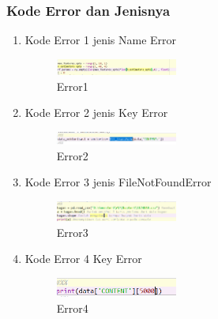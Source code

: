         \subsubsection{Kode Error dan Jenisnya}
        \begin{enumerate}
            \item Kode Error 1 jenis Name Error
            \begin{figure}[H]
                \includegraphics[width=4cm]{figures/1174040/chapter4/err1.png}
                \centering
                \caption{Error1}
            \end{figure}
            \item Kode Error 2 jenis Key Error
            \begin{figure}[H]
                \includegraphics[width=4cm]{figures/1174040/chapter4/err2.png}
                \centering
                \caption{Error2}
            \end{figure}
            \item Kode Error 3 jenis FileNotFoundError
            \begin{figure}[H]
                \includegraphics[width=4cm]{figures/1174040/chapter4/err3.png}
                \centering
                \caption{Error3}
            \end{figure}
            \item Kode Error 4 Key Error
            \begin{figure}[H]
                \includegraphics[width=4cm]{figures/1174040/chapter4/err4.png}
                \centering
                \caption{Error4}
            \end{figure}
        \end{enumerate}
